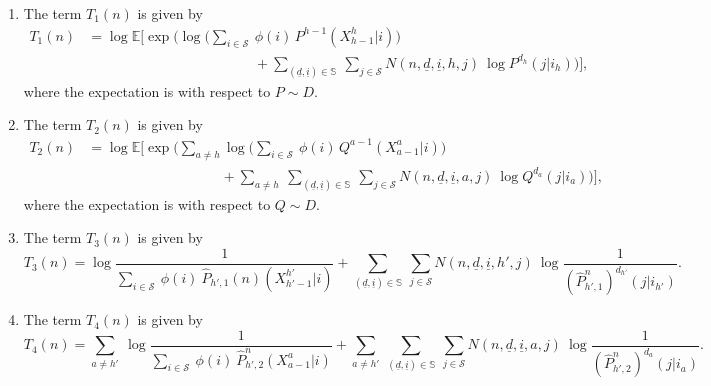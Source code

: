 \begin{enumerate}
	\item The term $T_1(n)$ is given by
	\begin{align}
 	T_1(n)&=\log \mathbb{E}\bigg[\exp\bigg(\log \bigg(\sum\limits_{i\in \mathcal{S}}~\phi(i)\, P^{h-1}(X_{h-1}^h|i)\bigg) \nonumber\\
	&\hspace{5cm}+ \sum\limits_{(\underline{d}, \underline{i})\in \mathbb{S}}~\sum\limits_{j\in \mathcal{S}}N(n, \underline{d}, \underline{i}, h, j)~ \log P^{d_h}(j|i_h)\bigg)\bigg],
 	\label{eq:T_1(n)}
    \end{align}
    where the expectation is with respect to $P\sim D$.
	
	\item The term $T_2(n)$ is given by
	\begin{align}
		T_2(n) &= \log \mathbb{E}\bigg[\exp\bigg(\sum\limits_{a\neq h} \log \bigg(\sum\limits_{i\in \mathcal{S}}~\phi(i)\,Q^{a-1}(X_{a-1}^a|i)\bigg) \nonumber\\
		&\hspace{4cm}+\sum\limits_{a\neq h}~\sum\limits_{(\underline{d}, \underline{i})\in \mathbb{S}}~\sum\limits_{j\in \mathcal{S}}N(n, \underline{d}, \underline{i}, a, j)~ \log Q^{d_a}(j|i_a)\bigg)\bigg],
		\label{eq:T_2(n)}
	\end{align}
	where the expectation is with respect to $Q\sim D$.

    \item The term $T_3(n)$ is given by
    \begin{equation}
    	T_3(n) = \log \frac{1}{\sum\limits_{i\in \mathcal{S}}~\phi(i)~\hat{P}_{h', 1}(n)(X_{h'-1}^{h'}|i)} + \sum\limits_{(\underline{d}, \underline{i})\in \mathbb{S}}~\sum\limits_{j\in \mathcal{S}}N(n, \underline{d}, \underline{i}, h', j)~ \log \frac{1}{(\hat{P}^n_{h',1})^{d_{h'}}(j|i_{h'})}.
    	\label{eq:T_3(n)}
    \end{equation}

    \item The term $T_4(n)$ is given by
    \begin{equation}
    	T_4(n) = \sum\limits_{a\neq h'}~\log \frac{1}{\sum\limits_{i\in \mathcal{S}}~\phi(i)~\hat{P}^n_{h',2}(X_{a-1}^{a}|i)} + \sum\limits_{a\neq h'}~\sum\limits_{(\underline{d}, \underline{i})\in \mathbb{S}}~\sum\limits_{j\in \mathcal{S}}N(n, \underline{d}, \underline{i}, a, j)~ \log \frac{1}{(\hat{P}^n_{h',2})^{d_a}(j|i_a)}.
    	\label{eq:T_4(n)}
    \end{equation}
\end{enumerate} 
